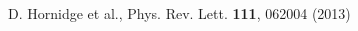 \documentclass[a4paper,10pt]{article}
\begin{document}
\begin{thebibliography}{00}



D. Hornidge et al.,
Phys. Rev. Lett. \textbf{111}, 062004 (2013)









\end{thebibliography}
\end{document}
